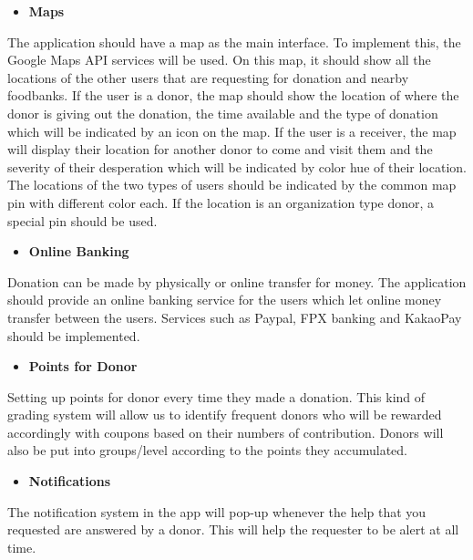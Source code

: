 \documentclass[conference]{IEEEtran}
\begin{document}
\begin{itemize}
\item \textbf{Maps}
\end{itemize}
\par The application should have a map as the main interface. To implement this, the Google Maps API services will be used. On this map, it should show all the locations of the other users that are requesting for donation and nearby foodbanks. If the user is a donor, the map should show the location of where the donor is giving out the donation, the time available and the type of donation which will be indicated by an icon on the map. If the user is a receiver, the map will display their location for another donor to come and visit them and the severity of their desperation which will be indicated by color hue of their location. The locations of the two types of users should be indicated by the common map pin with different color each. If the location is an organization type donor, a special pin should be used.\\
\begin{itemize}
\item \textbf{Online Banking}
\end{itemize}
\par Donation can be made by physically or online transfer for money. The application should provide an online banking service for the users which let online money transfer between the users. Services such as Paypal, FPX banking and KakaoPay should be implemented.\\
\begin{itemize}
\item \textbf{Points for Donor}
\end{itemize}
\par Setting up points for donor every time they made a donation. This kind of grading system will allow us to identify frequent donors who will be rewarded accordingly with coupons based on their numbers of contribution. Donors will also be put into groups/level according to the points they accumulated.\\
\begin{itemize}
\item \textbf{Notifications}
\end{itemize}
\par The notification system in the app will pop-up whenever the help that you requested are answered by a donor. This will help the requester to be alert at all time.\\
\end{document}
